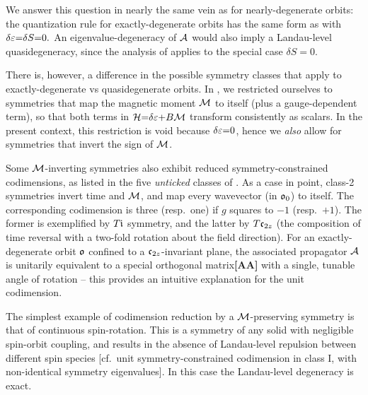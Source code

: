 \documentclass[aps, prb, showpacs, twocolumn, notitlepage, superscriptaddress]{revtex4-1}
\begin{document}


We answer this question in nearly the same vein as for nearly-degenerate orbits: the quantization rule for exactly-degenerate orbits\cite{topoferm} has the same form as  with $\delta \varepsilon{=}\delta S{=}0.$ An eigenvalue-degeneracy of ${\cal A}$ would also imply a Landau-level quasidegeneracy, since the analysis of  applies to the special case $\delta S{=}0$. 

There is, however, a difference in the possible symmetry classes that apply to exactly-degenerate vs quasidegenerate orbits.  In , we restricted ourselves to symmetries  that map the magnetic moment  ${\cal M}$ to itself (plus a gauge-dependent term\cite{100p}), so that both terms in ${\cal H}{=}\delta \varepsilon{+}B{\cal M}$ transform consistently as scalars. In the present context, this restriction is void because $\delta\varepsilon{=}0$, hence we \textit{also} allow for symmetries that invert the sign of ${\cal M}$. 

Some ${\cal M}$-inverting symmetries also exhibit reduced symmetry-constrained codimensions, as listed in the five \textit{unticked} classes of . As a case in point, class-2 symmetries invert time and ${\cal M}$, and map  every wavevector (in $\mathfrak{o}_0$) to itself. The corresponding codimension is three (resp.\ one) if $g$ squares to $-1$ (resp.\ $+1$). The former is exemplified by $T\mathfrak{i}$ symmetry, and the latter by $T\mathfrak{c}_{2z}$ (the composition of time reversal with a two-fold rotation about the field direction). For an exactly-degenerate orbit $\mathfrak{o}$ confined to a $\mathfrak{c}_{2z}$-invariant plane, the associated propagator ${\cal A}$ is unitarily equivalent to a special orthogonal matrix\cite{100p}\textbf{[AA]} with a single, tunable angle of rotation -- this provides an intuitive explanation for the unit codimension.


The simplest example of codimension reduction by a ${\cal M}$-preserving symmetry is that of continuous spin-rotation. This is a symmetry of any solid with negligible spin-orbit coupling, and results in the absence of Landau-level repulsion between different spin species [cf.\ unit symmetry-constrained codimension in class I, with non-identical symmetry eigenvalues]. In this case the Landau-level degeneracy is exact.  
\end{document}
